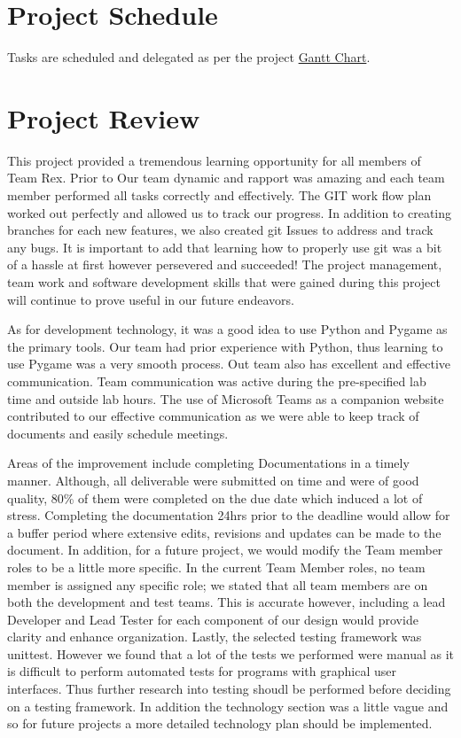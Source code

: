 \documentclass{article}
\begin{document}
	\section{Project Schedule}

Tasks are scheduled and delegated as per the project
\label{subsec:Tasks}
\href{https://gitlab.cas.mcmaster.ca/maramotc/se3xa3/-/blob/main/GanttChart.pdf}{\color{blue}Gantt Chart}.
		
	
	
	\section{Project Review}
	\color{blue}
	This project provided a tremendous learning opportunity for all members of Team Rex. Prior to
	Our team dynamic and rapport was amazing and each team member performed all tasks correctly and effectively.
	The GIT work flow plan worked out perfectly and allowed us to track our progress. In addition to creating branches for each new features, we also created git Issues to address and track any bugs. It is important to add that learning how to properly use git was a bit of a hassle at first however persevered and succeeded!
	The project management, team work and software development skills that were gained during this project will continue to prove useful in our future endeavors.
	
	As for development technology, it was a good idea to use Python and Pygame as the primary tools.
	Our team had prior experience with Python, thus learning to use Pygame was a very smooth process. 
	Out team also has excellent and effective communication. Team communication was active during the pre-specified lab time and outside lab hours. The use of Microsoft Teams as a companion website contributed to our effective communication as we were able to keep track of documents and easily schedule meetings.
	
	
	Areas of the improvement include completing Documentations in a timely manner.
	Although, all deliverable were submitted on time and were of good quality, 80\% of them were completed on the due date which induced a lot of stress. Completing the documentation 24hrs prior to the deadline would allow for a buffer period where extensive edits, revisions and updates can be made to the document.
	In addition, for a future project, we would modify the Team member roles to be a little more specific. 
	In the current Team Member roles, no team member is assigned any specific role; we stated that all team members are on both the development and test teams. This is accurate however, including a lead Developer and Lead Tester for each component of our design would provide clarity and enhance organization. Lastly, the selected testing framework was unittest. However we found that a lot of the tests we performed were manual as it is difficult to perform automated tests for programs with graphical user interfaces. Thus further research into testing shoudl be performed before deciding on a testing framework.
	In addition the technology section was a little vague and so for future projects a more detailed technology plan should be implemented.
\end{document}
